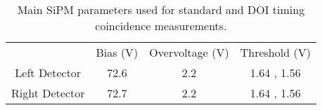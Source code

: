 \begin{table}
\begin{tabular}{cccc}
{} & Bias (V) & Overvoltage (V) & Threshold (V) \\
Left Detector  &     72.6 &             2.2 &   1.64 , 1.56 \\
Right Detector &     72.7 &             2.2 &   1.64 , 1.56 \\
\end{tabular}
\caption{Main SiPM parameters used for standard and DOI timing coincidence measurements.} 
\label{tab:optimumparam}    
\end{table}

